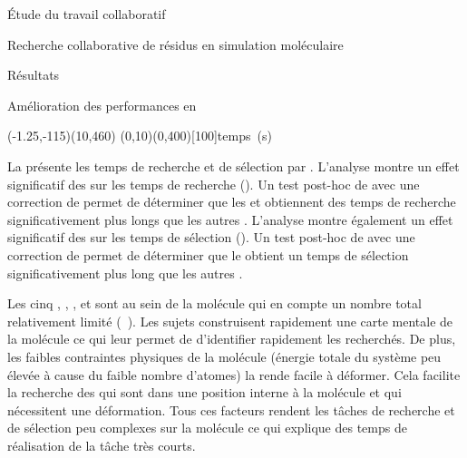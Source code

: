 \documentclass[myfrancais]{mythesis}
\begin{document}
\begin{mypart}{Étude du travail collaboratif}
\begin{mychapter}{Recherche collaborative de résidus en simulation moléculaire}
\begin{mysection}{Résultats}
\begin{mysubsection}{Amélioration des performances en }
					\begin{myfigure}
						\begin{myps}(-1.25,-115)(10,460)
							\myaxes(0,10){}(0,400)[100]{temps~(s)}
						\end{myps}
					\end{myfigure}

					La  présente les temps de recherche et de sélection par  .
					L'analyse montre un effet significatif des   sur les temps de recherche ().
					Un test post-hoc de  avec une correction de  permet de déterminer que les   et  obtiennent des temps de recherche significativement plus longs que les autres .
					L'analyse montre également un effet significatif des   sur les temps de sélection ().
					Un test post-hoc de  avec une correction de  permet de déterminer que le   obtient un temps de sélection significativement plus long que les autres .

					Les cinq  , , ,  et  sont au sein de la molécule \myTRPCAGE qui en compte un nombre total relativement limité (~).
					Les sujets construisent rapidement une carte mentale de la molécule ce qui leur permet de d'identifier rapidement les  recherchés.
					De plus, les faibles contraintes physiques de la molécule (énergie totale du système peu élevée à cause du faible nombre d'atomes) la rende facile à déformer.
					Cela facilite la recherche des  qui sont dans une position interne à la molécule et qui nécessitent une déformation.
					Tous ces facteurs rendent les tâches de recherche et de sélection peu complexes sur la molécule \myTRPCAGE ce qui explique des temps de réalisation de la tâche très courts.


\end{mysubsection}
\end{mysection}
\end{mychapter}
\end{mypart}
\end{document}
